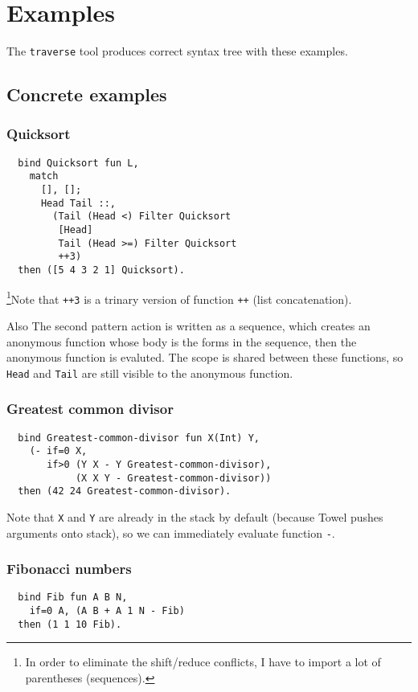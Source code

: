\documentclass{book}
\begin{document}
\chapter{Examples}
\label{chap:examples}

The \texttt{traverse} tool produces correct syntax tree with these examples.

\section{Concrete examples}
\subsection{Quicksort}
\begin{verbatim}
  bind Quicksort fun L,
    match
      [], [];
      Head Tail ::,
        (Tail (Head <) Filter Quicksort
         [Head]
         Tail (Head >=) Filter Quicksort
         ++3)
  then ([5 4 3 2 1] Quicksort).
\end{verbatim}

\footnote{In order to eliminate the shift/reduce conflicts, I have to import a lot of parentheses (sequences).}Note that \texttt{++3} is a trinary version of function \texttt{++} (list concatenation).

Also The second pattern action is written as a sequence, which creates an anonymous function whose body is the forms in the sequence, then the anonymous function is evaluted. The scope is shared between these functions, so \texttt{Head} and \texttt{Tail} are still visible to the anonymous function.

\subsection{Greatest common divisor}
\begin{verbatim}
  bind Greatest-common-divisor fun X(Int) Y,
    (- if=0 X,
       if>0 (Y X - Y Greatest-common-divisor),
            (X X Y - Greatest-common-divisor))
  then (42 24 Greatest-common-divisor).
\end{verbatim}

Note that \texttt{X} and \texttt{Y} are already in the stack by default (because Towel pushes arguments onto stack), so we can immediately evaluate function \texttt{-}.

\subsection{Fibonacci numbers}
\begin{verbatim}
  bind Fib fun A B N,
    if=0 A, (A B + A 1 N - Fib)
  then (1 1 10 Fib).
\end{verbatim}
\end{document}
